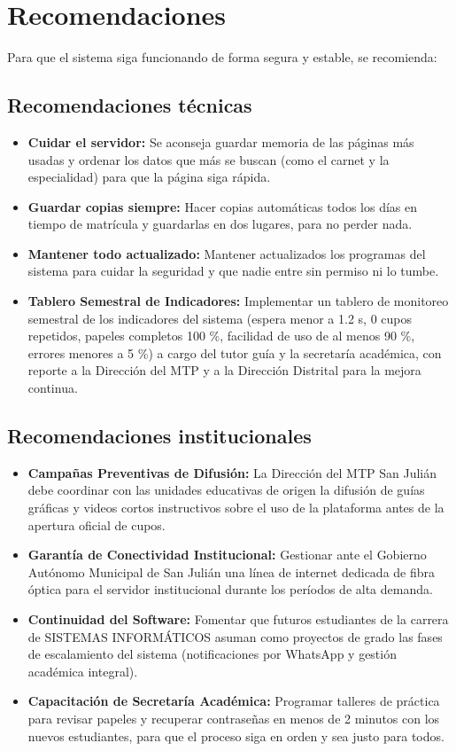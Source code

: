 \section{Recomendaciones}
\label{sec:recomendaciones}

Para que el sistema siga funcionando de forma segura y estable, se recomienda:

\subsection{Recomendaciones técnicas}

\begin{itemize}
    \item \textbf{Cuidar el servidor:} Se aconseja guardar memoria de las páginas más usadas y ordenar los datos que más se buscan (como el carnet y la especialidad) para que la página siga rápida.
    \item \textbf{Guardar copias siempre:} Hacer copias automáticas todos los días en tiempo de matrícula y guardarlas en dos lugares, para no perder nada.
    \item \textbf{Mantener todo actualizado:} Mantener actualizados los programas del sistema para cuidar la seguridad y que nadie entre sin permiso ni lo tumbe.
    \item \textbf{Tablero Semestral de Indicadores:} Implementar un tablero de monitoreo semestral de los indicadores del sistema (espera menor a 1.2 s, 0 cupos repetidos, papeles completos 100 \%, facilidad de uso de al menos 90 \%, errores menores a 5 \%) a cargo del tutor guía y la secretaría académica, con reporte a la Dirección del MTP y a la Dirección Distrital para la mejora continua.
\end{itemize}

\subsection{Recomendaciones institucionales}

\begin{itemize}
    \item \textbf{Campañas Preventivas de Difusión:} La Dirección del MTP San Julián debe coordinar con las unidades educativas de origen la difusión de guías gráficas y videos cortos instructivos sobre el uso de la plataforma antes de la apertura oficial de cupos.
    \item \textbf{Garantía de Conectividad Institucional:} Gestionar ante el Gobierno Autónomo Municipal de San Julián una línea de internet dedicada de fibra óptica para el servidor institucional durante los períodos de alta demanda.
    \item \textbf{Continuidad del Software:} Fomentar que futuros estudiantes de la carrera de SISTEMAS INFORMÁTICOS asuman como proyectos de grado las fases de escalamiento del sistema (notificaciones por WhatsApp y gestión académica integral).
    \item \textbf{Capacitación de Secretaría Académica:} Programar talleres de práctica para revisar papeles y recuperar contraseñas en menos de 2 minutos con los nuevos estudiantes, para que el proceso siga en orden y sea justo para todos.
\end{itemize}
